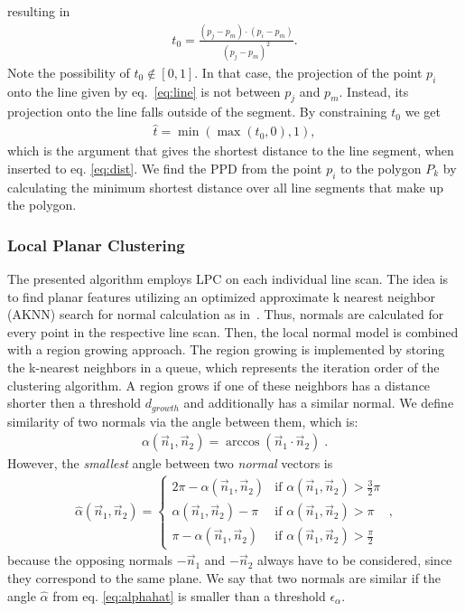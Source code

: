 resulting in 
\begin{align}
	t_0 = \frac{\left( p_j - p_m \right) \cdot \left( p_i - p_m \right)}{\left( p_j - p_m \right)^2} .
\end{align}
Note the possibility of $t_0 \notin \left[ 0, 1 \right]$. 
In that case, the projection of the point $p_i$ onto the line given by eq.~\ref{eq:line} is not between $p_j$ and $p_m$. 
Instead, its projection onto the line falls outside of the segment.
By constraining $t_0$ we get 
\begin{align}
\label{eq:minmax}
	\hat t = \min \left( \max \left( t_0, 0\right) , 1 \right) ,
\end{align}
which is the argument that gives the shortest distance to the line segment, when inserted to eq. \ref{eq:dist}.
We find the PPD from the point $p_i$ to the polygon $P_k$ by calculating the minimum shortest distance over all line segments that make up the polygon.  

\subsubsection{Local Planar Clustering}

The presented algorithm employs LPC on each individual line scan.
The idea is to find planar features utilizing an optimized approximate k nearest neighbor (AKNN) search for normal calculation as in~\cite{aknnbbs}.
Thus, normals are calculated for every point in the respective line scan.
Then, the local normal model is combined with a region growing approach.
The region growing is implemented by storing the k-nearest neighbors in a queue, which represents the iteration order of the clustering algorithm.
A region grows if one of these neighbors has a distance shorter then a threshold $d_{growth}$ and additionally has a similar normal.
We define similarity of two normals via the angle between them, which is:
\begin{align}
\label{eq:smallestalpha}
	\alpha(\vec{n}_1, \vec{n}_2) = \arccos(\vec{n}_1 \cdot \vec{n}_2) \; .
\end{align}
However, the \textit{smallest} angle between two \textit{normal} vectors is 
\begin{align}
\label{eq:alphahat}
\hat \alpha(\vec{n}_1, \vec{n}_2) = 
\begin{cases}
	2\pi - \alpha(\vec{n}_1, \vec{n}_2) & \text{if  } \alpha(\vec{n}_1, \vec{n}_2) > \frac{3}{2} \pi \\
	\alpha(\vec{n}_1, \vec{n}_2) - \pi & \text{if  } \alpha(\vec{n}_1, \vec{n}_2) > \pi \\
	\pi - \alpha(\vec{n}_1, \vec{n}_2) & \text{if  } \alpha(\vec{n}_1, \vec{n}_2) > \frac{\pi}{2} 
\end{cases}
\; ,
\end{align}
because the opposing normals $-\vec{n}_1$ and $-\vec{n}_2$ always have to be considered, since they correspond to the same plane.
We say that two normals are similar if the angle $\hat \alpha$ from eq. \ref{eq:alphahat} is smaller than a threshold $\epsilon_{\alpha}$. 

